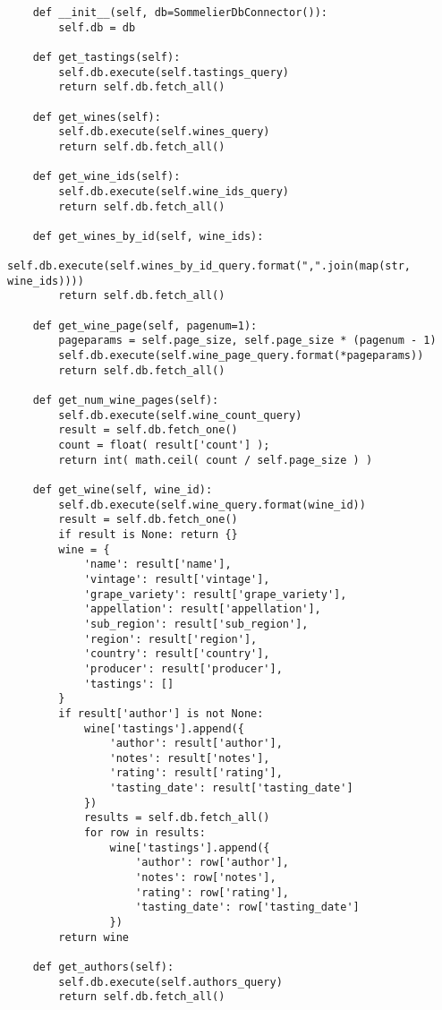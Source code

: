 \begin{verbatim}
    def __init__(self, db=SommelierDbConnector()):
        self.db = db
    
    def get_tastings(self):
        self.db.execute(self.tastings_query)
        return self.db.fetch_all()

    def get_wines(self):
        self.db.execute(self.wines_query)
        return self.db.fetch_all()

    def get_wine_ids(self):
        self.db.execute(self.wine_ids_query)
        return self.db.fetch_all()

    def get_wines_by_id(self, wine_ids):
        self.db.execute(self.wines_by_id_query.format(",".join(map(str, wine_ids))))
        return self.db.fetch_all()

    def get_wine_page(self, pagenum=1):
        pageparams = self.page_size, self.page_size * (pagenum - 1)
        self.db.execute(self.wine_page_query.format(*pageparams))
        return self.db.fetch_all()

    def get_num_wine_pages(self):
        self.db.execute(self.wine_count_query)
        result = self.db.fetch_one()
        count = float( result['count'] );
        return int( math.ceil( count / self.page_size ) )

    def get_wine(self, wine_id):
        self.db.execute(self.wine_query.format(wine_id))
        result = self.db.fetch_one()
        if result is None: return {}
        wine = {
            'name': result['name'],
            'vintage': result['vintage'],
            'grape_variety': result['grape_variety'],
            'appellation': result['appellation'],
            'sub_region': result['sub_region'],
            'region': result['region'],
            'country': result['country'],
            'producer': result['producer'],
            'tastings': []
        }
        if result['author'] is not None:
            wine['tastings'].append({
                'author': result['author'],
                'notes': result['notes'],
                'rating': result['rating'],
                'tasting_date': result['tasting_date']
            })
            results = self.db.fetch_all()
            for row in results:
                wine['tastings'].append({
                    'author': row['author'],
                    'notes': row['notes'],
                    'rating': row['rating'],
                    'tasting_date': row['tasting_date']
                })
        return wine

    def get_authors(self):
        self.db.execute(self.authors_query)
        return self.db.fetch_all()


\end{verbatim}
